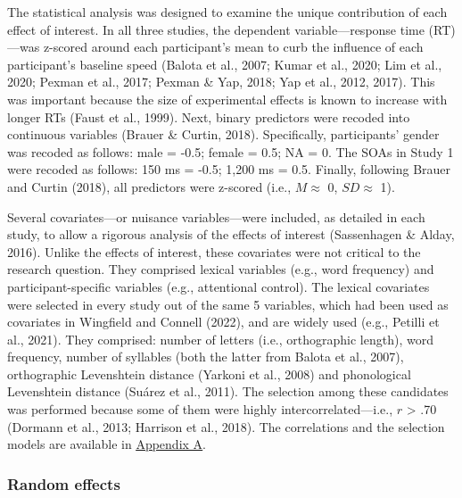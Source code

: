 \documentclass[
  12pt,
  man,floatsintext]{apa7}
\begin{document}
The statistical analysis was designed to examine the unique contribution of each effect of interest. In all three studies, the dependent variable---response time (RT)---was z-scored around each participant's mean to curb the influence of each participant's baseline speed (Balota et al., 2007; Kumar et al., 2020; Lim et al., 2020; Pexman et al., 2017; Pexman \& Yap, 2018; Yap et al., 2012, 2017). This was important because the size of experimental effects is known to increase with longer RTs (Faust et al., 1999). Next, binary predictors were recoded into continuous variables (Brauer \& Curtin, 2018). Specifically, participants' gender was recoded as follows: male = -0.5; female = 0.5; NA = 0. The SOAs in Study 1 were recoded as follows: 150 ms = -0.5; 1,200 ms = 0.5. Finally, following Brauer and Curtin (2018), all predictors were z-scored (i.e., \(M \approx\) 0, \(SD \approx\) 1).

Several covariates---or nuisance variables---were included, as detailed in each study, to allow a rigorous analysis of the effects of interest (Sassenhagen \& Alday, 2016). Unlike the effects of interest, these covariates were not critical to the research question. They comprised lexical variables (e.g., word frequency) and participant-specific variables (e.g., attentional control). The lexical covariates were selected in every study out of the same 5 variables, which had been used as covariates in Wingfield and Connell (2022), and are widely used (e.g., Petilli et al., 2021). They comprised: number of letters (i.e., orthographic length), word frequency, number of syllables (both the latter from Balota et al., 2007), orthographic Levenshtein distance (Yarkoni et al., 2008) and phonological Levenshtein distance (Suárez et al., 2011). The selection among these candidates was performed because some of them were highly intercorrelated---i.e., \(r\) \textgreater{} .70 (Dormann et al., 2013; Harrison et al., 2018). The correlations and the selection models are available in \protect\hyperlink{appendix-A-lexical-covariates}{\underline{Appendix A}}.

\hypertarget{random-effects}{%
\subsubsection{Random effects}\label{random-effects}}
\end{document}
